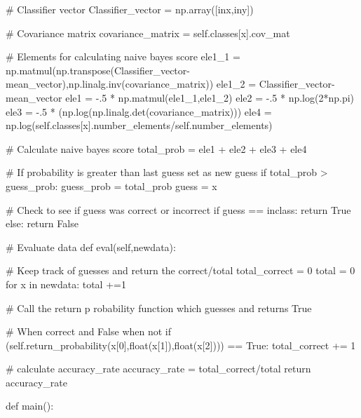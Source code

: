 \documentclass{article}
\begin{document}
\begin{flushleft}
\begin{python}
                        # Classifier vector
                        Classifier_vector = np.array([inx,iny])
                
                        # Covariance matrix
                        covariance_matrix = self.classes[x].cov_mat
                        
                        # Elements for calculating naive bayes score
                        ele1_1 = np.matmul(np.transpose(Classifier_vector-mean_vector),np.linalg.inv(covariance_matrix))
                        ele1_2 = Classifier_vector-mean_vector
                        ele1 = -.5 * np.matmul(ele1_1,ele1_2)
                        ele2 = -.5 * np.log(2*np.pi)
                        ele3 = -.5 * (np.log(np.linalg.det(covariance_matrix)))
                        ele4 = np.log(self.classes[x].number_elements/self.number_elements)
                
                        # Calculate naive bayes score
                        total_prob = ele1 + ele2 + ele3 + ele4
                
                        # If probability is greater than last guess set as new guess
                        if total_prob > guess_prob:
                                guess_prob = total_prob
                                guess = x
                
                # Check to see if guess was correct or incorrect
                if guess == inclass:
                        return True
                else:
                        return False
        
        # Evaluate data
        def eval(self,newdata):
                
                # Keep track of guesses and return the correct/total
                total_correct = 0
                total = 0
                for x in newdata:
                        total +=1

                        # Call the return p robability function which guesses and returns True 

                        # When correct and False when not
                        if (self.return_probability(x[0],float(x[1]),float(x[2]))) == True:
                                total_correct += 1

                # calculate accuracy_rate
                accuracy_rate = total_correct/total
                return accuracy_rate
        
def main():


\end{python}
\end{flushleft}
\end{document}
